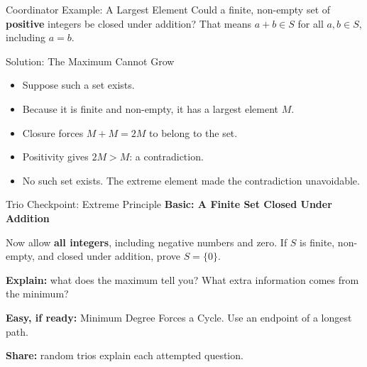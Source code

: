 \documentclass{beamer}
\begin{document}
\begin{frame}{Coordinator Example: A Largest Element}
    Could a finite, non-empty set of \textbf{positive} integers be
    closed under addition? That means $a+b\in S$ for all $a,b\in S$,
    including $a=b$.

    \begin{center}
    \end{center}
\end{frame}

\begin{frame}{Solution: The Maximum Cannot Grow}
    \begin{itemize}
        \item Suppose such a set exists.
        \item Because it is finite and non-empty, it has a largest
            element $M$.
        \item Closure forces $M+M=2M$ to belong to the set.
        \item Positivity gives $2M>M$: a contradiction.
        \item No such set exists. The extreme element made the
            contradiction unavoidable.
    \end{itemize}
\end{frame}

\begin{frame}{Trio Checkpoint: Extreme Principle}
    \textbf{Basic: A Finite Set Closed Under Addition}

    Now allow \textbf{all integers}, including negative numbers and zero.
    If $S$ is finite, non-empty, and closed under addition,
    prove $S=\{0\}$.

    \textbf{Explain:} what does the maximum tell you? What extra
    information comes from the minimum?

    \textbf{Easy, if ready:} Minimum Degree Forces a Cycle.
    Use an endpoint of a longest path.

    \textbf{Share:} random trios explain each attempted question.
\end{frame}
\end{document}
